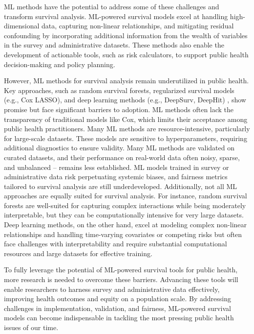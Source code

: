 ML methods have the potential to address some of these challenges and transform survival analysis. ML-powered survival models excel at handling high-dimensional data, capturing non-linear relationships, and mitigating residual confounding by incorporating additional information from the wealth of variables in the survey and administrative datasets. These methods also enable the development of actionable tools, such as risk calculators, to support public health decision-making and policy planning.

However, ML methods for survival analysis remain underutilized in public health. Key approaches, such as random survival forests, regularized survival models (e.g., Cox LASSO), and deep learning methods (e.g., DeepSurv, DeepHit) \citep{ishwaran2008random,katzman2018deepsurv,simon2011regularization,lee2018deephit}, show promise but face significant barriers to adoption. ML methods often lack the transparency of traditional models like Cox, which limits their acceptance among public health practitioners. Many ML methods are resource-intensive, particularly for large-scale datasets. These models are sensitive to hyperparameters, requiring additional diagnostics to ensure validity. Many ML methods are validated on curated datasets, and their performance on real-world data often noisy, sparse, and unbalanced – remains less established. ML models trained in survey or administrative data risk perpetuating systemic biases, and fairness metrics tailored to survival analysis are still underdeveloped. Additionally, not all ML approaches are equally suited for survival analysis. For instance, random survival forests are well-suited for capturing complex interactions while being moderately interpretable, but they can be computationally intensive for very large datasets. Deep learning methods, on the other hand, excel at modeling complex non-linear relationships and handling time-varying covariates or competing risks but often face challenges with interpretability and require substantial computational resources and large datasets for effective training.

To fully leverage the potential of ML-powered survival tools for public health, more research is needed to overcome these barriers. Advancing these tools will enable researchers to harness survey and administrative data effectively, improving health outcomes and equity on a population scale. By addressing challenges in implementation, validation, and fairness, ML-powered survival models can become indispensable in tackling the most pressing public health issues of our time.

